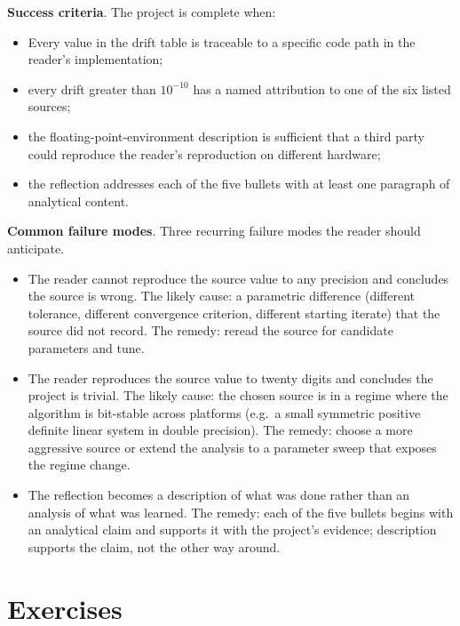 \begin{project}
\textbf{Success criteria}. The project is complete when:

\begin{itemize}[leftmargin=*]
  \item Every value in the drift table is traceable to a specific
    code path in the reader's implementation;
  \item every drift greater than $10^{-10}$ has a named attribution
    to one of the six listed sources;
  \item the floating-point-environment description is sufficient
    that a third party could reproduce the reader's reproduction on
    different hardware;
  \item the reflection addresses each of the five bullets with at
    least one paragraph of analytical content.
\end{itemize}

\textbf{Common failure modes}. Three recurring failure modes the
reader should anticipate.

\begin{itemize}[leftmargin=*]
  \item The reader cannot reproduce the source value to any precision
    and concludes the source is wrong. The likely cause: a
    parametric difference (different tolerance, different
    convergence criterion, different starting iterate) that the
    source did not record. The remedy: reread the source for
    candidate parameters and tune.
  \item The reader reproduces the source value to twenty digits and
    concludes the project is trivial. The likely cause: the chosen
    source is in a regime where the algorithm is bit-stable across
    platforms (e.g.\ a small symmetric positive definite linear
    system in double precision). The remedy: choose a more
    aggressive source or extend the analysis to a parameter sweep
    that exposes the regime change.
  \item The reflection becomes a description of what was done rather
    than an analysis of what was learned. The remedy: each of the
    five bullets begins with an analytical claim and supports it
    with the project's evidence; description supports the claim,
    not the other way around.
\end{itemize}
\end{project}

\section{Exercises}

